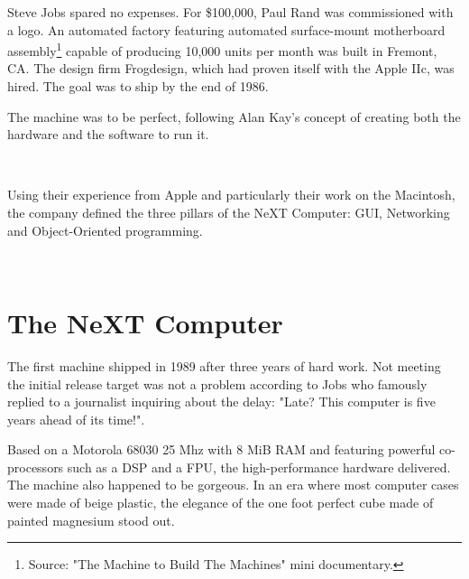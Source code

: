 Steve Jobs spared no expenses. For \$100,000, Paul Rand was commissioned with a logo. An automated factory featuring automated surface-mount motherboard assembly\footnote{Source: "The Machine to Build The Machines" mini documentary.} capable of producing 10,000 units per month was built in Fremont, CA. The design firm Frogdesign, which had proven itself with the Apple IIc, was hired. The goal was to ship by the end of 1986.\\
\par
The machine was to be perfect, following Alan Kay's concept of creating both the hardware and the software to run it.\\
\par
{}\\
\par

Using their experience from Apple and particularly their work on the Macintosh, the company defined the three pillars of the NeXT Computer: GUI, Networking and Object-Oriented programming.\\
\par
{}\\






\par
\section{The NeXT Computer}
The first machine shipped in 1989 after three years of hard work. Not meeting the initial release target was not a problem according to Jobs who famously replied to a journalist inquiring about the delay: "Late? This computer is five years ahead of its time!".\\
\par
Based on a Motorola 68030 25 Mhz with 8 MiB RAM and featuring powerful co-processors such as a DSP and a FPU, the high-performance hardware delivered. The machine also happened to be gorgeous. In an era where most computer cases were made of beige plastic, the elegance of the one foot perfect cube made of painted magnesium stood out.\\
\par
{}


